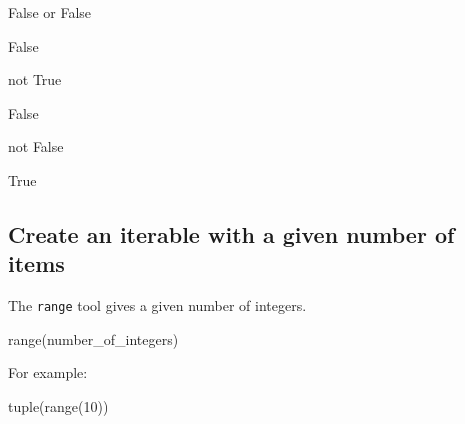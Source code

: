 \begin{pyin}
False or False
\end{pyin}





\begin{raw}
False
\end{raw}







\begin{pyin}
not True
\end{pyin}





\begin{raw}
False
\end{raw}







\begin{pyin}
not False
\end{pyin}





\begin{raw}
True
\end{raw}





\subsection{Create an iterable with a given number of items}
\label{\detokenize{tools-for-mathematics/05-combinations-permutations/how/main:creating-an-iterable-with-a-given-number-of-items}}\label{\detokenize{tools-for-mathematics/05-combinations-permutations/how/main:id4}}

The \texttt{range} tool gives a given number of integers.


\begin{api}
range(number_of_integers)
\end{api}



For example:




\begin{pyin}
tuple(range(10))
\end{pyin}





